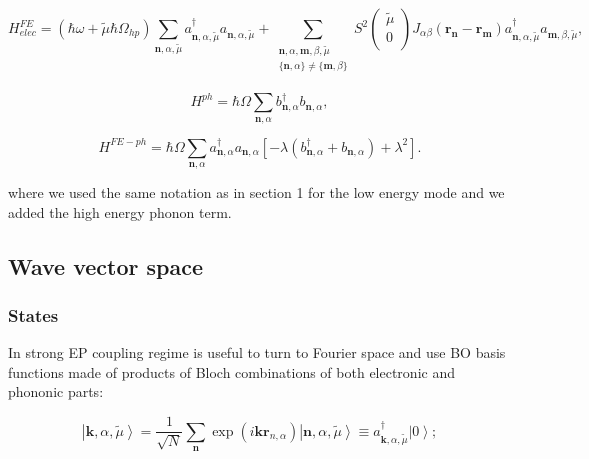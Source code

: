 \documentclass[pt12]{article}
\newcommand{\bfk}{\mathbf{k}}
\newcommand{\bfr}{\mathbf{r}}
\newcommand{\bfn}{\mathbf{n}}
\newcommand{\bfm}{\mathbf{m}}
\newcommand{\tmu}{\tilde{\mu}}
\begin{document}
\begin{equation}
H^{FE}_{elec}=\left( \hbar\omega+\tmu\hbar\Omega_{hp}
\right)\sum_{\bfn,\alpha,\tmu}a^\dagger_{\bfn,\alpha,\tmu}a_{\bfn,\alpha,\tmu}
+\sum_{
\begin{array}{c}
                                  \bfn,\alpha,\bfm,\beta,\tmu \\
                                  \{\bfn,\alpha\} \neq \{\bfm,\beta\} \\
                                \end{array}
}  S^2\left(
                                  \begin{array}{c}
                                    \tmu \\
                                    0 \\
                                  \end{array}
                                \right)
J_{\alpha\beta}(\bfr_{\bfn}-\bfr_{\bfm})
a^\dagger_{\bfn,\alpha,\tmu}a_{\bfm,\beta,\tmu},
\end{equation}

\begin{equation}
H^{ph}=\hbar\Omega\sum_{\bfn,\alpha}b^\dagger_{\bfn,\alpha}b_{\bfn,\alpha},
\end{equation}

\begin{equation}\label{H_FE-ph}
H^{FE-ph}=\hbar\Omega\sum_{\bfn,\alpha}a^\dagger_{\bfn,\alpha}a_{\bfn,\alpha}
\left[-\lambda\left(b^\dagger_{\bfn,\alpha}+b_{\bfn,\alpha}\right)+\lambda^2\right].
\end{equation}


where we used the same notation as in section 1 for the low energy
mode and we added the high energy phonon term.

\subsection{Wave vector space}

\subsubsection{States}
In strong EP coupling regime is useful to turn to Fourier space and use BO basis functions made of products of Bloch combinations of both electronic and phononic parts:

\begin{equation}\label{0P_k_states}
\left|\textbf{k},\alpha, \tmu \right>=\frac{1}{\sqrt{N}}\sum_\bfn
\exp\left( i\bfk\bfr_{n,\alpha} \right)\left|\textbf{n},\alpha, \tmu
\right> \equiv a^\dagger_{\bfk,\alpha,\tmu} \left|0\right> ;
\end{equation}
\end{document}
